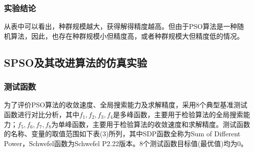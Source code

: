 \begin{table}[htbp]
\end{table}%

\subsubsection{实验结论}
从表中可以看出，种群规模越大，获得解得精度越高。但由于PSO算法是一种随机算法，因此，也存在种群规模小但精度高，或者种群规模大但精度低的情况。
\subsection{SPSO及其改进算法的仿真实验}
\subsubsection{测试函数}
为了评价PSO算法的收敛速度、全局搜索能力及求解精度，采用8个典型基准测试函数进行对比分析，其中$f_1,f_2,f_3,f_4$是多峰函数，主要用于检验算法的全局搜索能力；$f_5,f_6,f_7,f_8$为单峰函数，主要用于检验算法的收敛速度和求解精度。测试函数的名称、变量的取值范围如下表(3)所列，其中SDP函数全称为Sum of Different Power，Schwefel函数为Schwefel P2.22版本。8个测试函数目标值(最优值)均为0。

